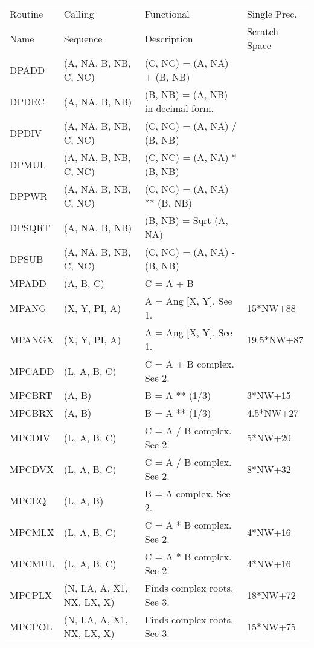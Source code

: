 \begin{footnotesize} \begin{tt} 

\begin{table} \begin{center} \begin{tabular}{|l|l|l|l|}
\hline
Routine &  Calling   &  Functional  & Single Prec. \\
Name    &  Sequence  &  Description & Scratch Space \\
\hline
DPADD   &  (A, NA, B, NB, C, NC) & (C, NC) = (A, NA) + (B, NB) & \\
DPDEC   &  (A, NA, B, NB) & (B, NB) = (A, NB) in decimal form. & \\
DPDIV   &  (A, NA, B, NB, C, NC) & (C, NC) = (A, NA) / (B, NB) & \\
DPMUL   &  (A, NA, B, NB, C, NC) & (C, NC) = (A, NA) * (B, NB) & \\
DPPWR   &  (A, NA, B, NB, C, NC) & (C, NC) = (A, NA) ** (B, NB) & \\
DPSQRT  &  (A, NA, B, NB) & (B, NB) = Sqrt (A, NA) & \\
DPSUB   &  (A, NA, B, NB, C, NC) & (C, NC) = (A, NA) - (B, NB) & \\
MPADD   &  (A, B, C) & C = A + B & \\
MPANG   &  (X, Y, PI, A) & A = Ang [X, Y].  See 1. & 15*NW+88 \\
MPANGX  &  (X, Y, PI, A) & A = Ang [X, Y].  See 1. & 19.5*NW+87 \\
MPCADD  &  (L, A, B, C) & C = A + B complex.  See 2. & \\
MPCBRT  &  (A, B) & B = A ** (1/3) & 3*NW+15 \\
MPCBRX  &  (A, B) & B = A ** (1/3) & 4.5*NW+27 \\
MPCDIV  &  (L, A, B, C) & C = A / B complex.  See 2. & 5*NW+20 \\
MPCDVX  &  (L, A, B, C) & C = A / B complex.  See 2. & 8*NW+32 \\
MPCEQ   &  (L, A, B) & B = A complex.  See 2. & \\
MPCMLX  &  (L, A, B, C) & C = A * B complex.  See 2. & 4*NW+16 \\
MPCMUL  &  (L, A, B, C) & C = A * B complex.  See 2. & 4*NW+16 \\
MPCPLX  &  (N, LA, A, X1, NX, LX, X) & Finds complex roots. See
3. & 18*NW+72 \\
MPCPOL  &  (N, LA, A, X1, NX, LX, X) & Finds complex roots. See
3. & 15*NW+75 \\

\end{tabular}
\end{center}
\end{table}
\end{tt}
\end{footnotesize}
